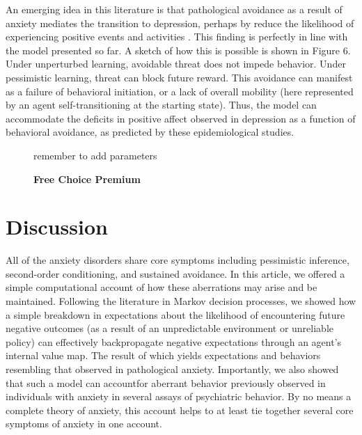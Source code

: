 \documentclass[11pt]{article} %
\begin{document}
An emerging idea in this literature is that pathological avoidance as a result of anxiety mediates the transition to depression, perhaps by reduce the likelihood of experiencing positive events and activities \citep{moitra2008, jacobson2014}. This finding is perfectly in line with the model presented so far. A sketch of how this is possible is shown in Figure 6. Under unperturbed learning, avoidable threat does not impede behavior. Under pessimistic learning, threat can block future reward. This avoidance can manifest as a failure of behavioral initiation, or a lack of overall mobility (here represented by an agent self-transitioning at the starting state). Thus, the model can accommodate the deficits in positive affect observed in depression as a function of behavioral avoidance, as predicted by these epidemiological studies.

\begin{figure}
  \centerline{%
  }
  \caption{\textbf{Free Choice Premium}}
  \par remember to add parameters
\end{figure}

\section{Discussion}

All of the anxiety disorders share core symptoms including pessimistic inference, second-order conditioning, and sustained avoidance. In this article, we offered a simple computational account of how these aberrations may arise and be maintained. Following the literature in Markov decision processes, we showed how a simple breakdown in expectations about the likelihood of encountering future negative outcomes (as a result of an unpredictable environment or unreliable policy) can effectively backpropagate negative expectations through an agent's internal value map. The result of which yields expectations and behaviors resembling that observed in pathological anxiety. Importantly, we also showed that such a model can accountfor aberrant behavior previously observed in individuals with anxiety in several assays of psychiatric behavior. By no means a complete theory of anxiety, this account helps to at least tie together several core symptoms of anxiety in one account.
\end{document}
